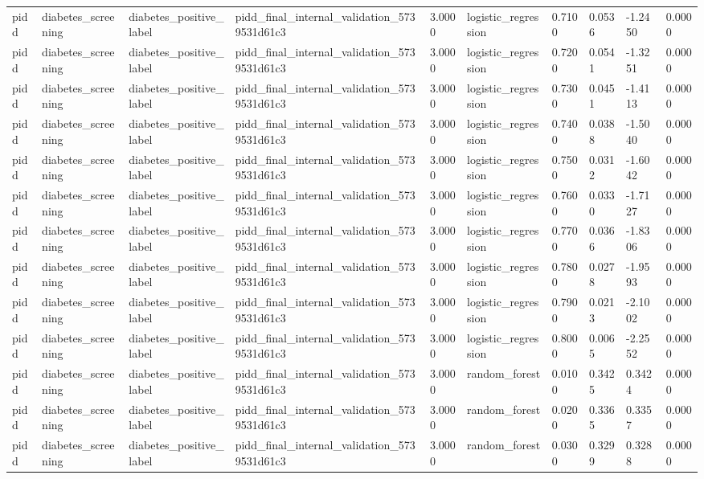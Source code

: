\begin{tabular}{llllllllll}
pidd & diabetes\_screening & diabetes\_positive\_label & pidd\_final\_internal\_validation\_5739531d61c3 & 3.0000 & logistic\_regression & 0.7100 & 0.0536 & -1.2450 & 0.0000 \\
pidd & diabetes\_screening & diabetes\_positive\_label & pidd\_final\_internal\_validation\_5739531d61c3 & 3.0000 & logistic\_regression & 0.7200 & 0.0541 & -1.3251 & 0.0000 \\
pidd & diabetes\_screening & diabetes\_positive\_label & pidd\_final\_internal\_validation\_5739531d61c3 & 3.0000 & logistic\_regression & 0.7300 & 0.0451 & -1.4113 & 0.0000 \\
pidd & diabetes\_screening & diabetes\_positive\_label & pidd\_final\_internal\_validation\_5739531d61c3 & 3.0000 & logistic\_regression & 0.7400 & 0.0388 & -1.5040 & 0.0000 \\
pidd & diabetes\_screening & diabetes\_positive\_label & pidd\_final\_internal\_validation\_5739531d61c3 & 3.0000 & logistic\_regression & 0.7500 & 0.0312 & -1.6042 & 0.0000 \\
pidd & diabetes\_screening & diabetes\_positive\_label & pidd\_final\_internal\_validation\_5739531d61c3 & 3.0000 & logistic\_regression & 0.7600 & 0.0330 & -1.7127 & 0.0000 \\
pidd & diabetes\_screening & diabetes\_positive\_label & pidd\_final\_internal\_validation\_5739531d61c3 & 3.0000 & logistic\_regression & 0.7700 & 0.0366 & -1.8306 & 0.0000 \\
pidd & diabetes\_screening & diabetes\_positive\_label & pidd\_final\_internal\_validation\_5739531d61c3 & 3.0000 & logistic\_regression & 0.7800 & 0.0278 & -1.9593 & 0.0000 \\
pidd & diabetes\_screening & diabetes\_positive\_label & pidd\_final\_internal\_validation\_5739531d61c3 & 3.0000 & logistic\_regression & 0.7900 & 0.0213 & -2.1002 & 0.0000 \\
pidd & diabetes\_screening & diabetes\_positive\_label & pidd\_final\_internal\_validation\_5739531d61c3 & 3.0000 & logistic\_regression & 0.8000 & 0.0065 & -2.2552 & 0.0000 \\
pidd & diabetes\_screening & diabetes\_positive\_label & pidd\_final\_internal\_validation\_5739531d61c3 & 3.0000 & random\_forest & 0.0100 & 0.3425 & 0.3424 & 0.0000 \\
pidd & diabetes\_screening & diabetes\_positive\_label & pidd\_final\_internal\_validation\_5739531d61c3 & 3.0000 & random\_forest & 0.0200 & 0.3365 & 0.3357 & 0.0000 \\
pidd & diabetes\_screening & diabetes\_positive\_label & pidd\_final\_internal\_validation\_5739531d61c3 & 3.0000 & random\_forest & 0.0300 & 0.3299 & 0.3288 & 0.0000 \\

\end{tabular}
